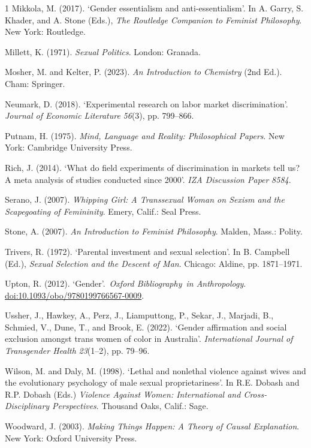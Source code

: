 \begin{hangparas}{\hangingindent}{1}
Mikkola, M. (2017). `Gender essentialism and anti-essentialism'. In A.
Garry, S. Khader, and A. Stone (Eds.), \emph{The Routledge Companion to
Feminist Philosophy}. New York: Routledge.

Millett, K. (1971). \emph{Sexual Politics}. London: Granada.

Mosher, M. and Kelter, P. (2023). \emph{An Introduction to Chemistry}
(2nd Ed.). Cham: Springer.

Neumark, D. (2018). `Experimental research on labor market
discrimination'. \emph{Journal of Economic Literature} \emph{56}(3), pp.
799--866.

Putnam, H. (1975). \emph{Mind, Language and Reality: Philosophical
Papers}. New York: Cambridge University Press.

Rich, J. (2014). `What do field experiments of discrimination in markets
tell us? A meta analysis of studies conducted since 2000'. \emph{IZA
Discussion Paper} \emph{8584}.

Serano, J. (2007). \emph{Whipping Girl: A Transsexual Woman on Sexism
and the Scapegoating of Femininity}. Emery, Calif.: Seal Press.

Stone, A. (2007). \emph{An Introduction to Feminist Philosophy}. Malden,
Mass.: Polity.

Trivers, R. (1972). `Parental investment and sexual selection'. In B.
Campbell (Ed.), \emph{Sexual Selection and the Descent of Man}. Chicago:
Aldine, pp. 1871--1971.

Upton, R. (2012). `Gender'.~\emph{Oxford Bibliography}~\emph{in
Anthropology}. \url{doi:10.1093/obo/9780199766567-0009}.

Ussher, J., Hawkey, A., Perz, J., Liamputtong, P., Sekar, J., Marjadi,
B., Schmied, V., Dune, T., and Brook, E. (2022). `Gender affirmation and
social exclusion amongst trans women of color in Australia'.
\emph{International Journal of Transgender Health} \emph{23}(1--2), pp.
79--96.

Wilson, M. and Daly, M. (1998). `Lethal and nonlethal violence against
wives and the evolutionary psychology of male sexual proprietariness'.
In R.E. Dobash and R.P. Dobash (Eds.) \emph{Violence Against Women:
International and Cross-Disciplinary Perspectives}. Thousand Oaks,
Calif.: Sage.

Woodward, J. (2003). \emph{Making Things Happen: A Theory of Causal
Explanation}. New York: Oxford University Press.

\end{hangparas}